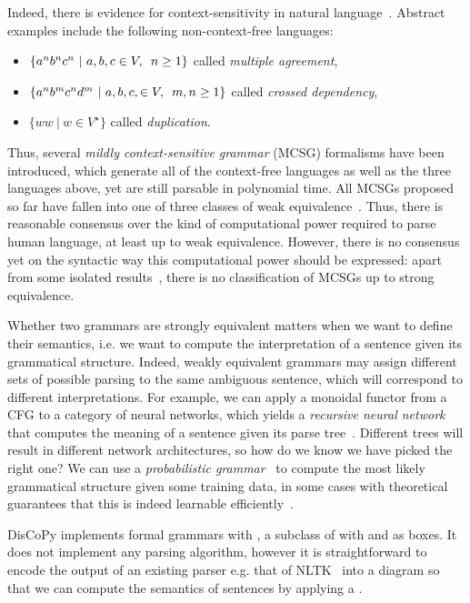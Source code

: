 Indeed, there is evidence for context-sensitivity in natural language~\cite{Shieber87}.
Abstract examples include the following non-context-free languages:
\begin{itemize}
  \item $\{ a^n b^n c^n \ \vert \ a, b, c \in V, \enspace n \geq 1 \}$ called \emph{multiple agreement},
  \item $\{ a^n b^m c^n d^m \ \vert \ a, b, c, \in V, \enspace m, n \geq 1 \}$ called \emph{crossed dependency},
  \item $\{ w w \ \vert \ w \in V^\star \}$ called \emph{duplication}.
\end{itemize}
Thus, several \emph{mildly context-sensitive grammar} (MCSG) formalisms have been introduced, which generate all of the context-free languages as well as the three languages above, yet are still parsable in polynomial time.
All MCSGs proposed so far have fallen into one of three classes of weak equivalence~\cite{Weir88}.
Thus, there is reasonable consensus over the kind of computational power required to parse human language, at least up to weak equivalence.
However, there is no consensus yet on the syntactic way this computational power should be expressed: apart from some isolated results~\cite{SchifferMaletti21}, there is no classification of MCSGs up to strong equivalence.

Whether two grammars are strongly equivalent matters when we want to define their semantics, i.e. we want to compute the interpretation of a sentence given its grammatical structure.
Indeed, weakly equivalent grammars may assign different sets of possible parsing to the same ambiguous sentence, which will correspond to different interpretations.
For example, we can apply a monoidal functor from a CFG to a category of neural networks, which yields a \emph{recursive neural network} that computes the meaning of a sentence given its parse tree~\cite{SocherEtAl11,SocherEtAl13}.
Different trees will result in different network architectures, so how do we know we have picked the right one?
We can use a \emph{probabilistic grammar}~\cite{Salomaa69} to compute the most likely grammatical structure given some training data, in some cases with theoretical guarantees that this is indeed learnable efficiently~\cite{ClarkEtAl06,ShibataYoshinaka16}.

DisCoPy implements formal grammars with , a subclass of  with  and  as boxes.
It does not implement any parsing algorithm, however it is straightforward to encode the output of an existing parser e.g. that of NLTK~\cite{LoperBird02} into a  diagram so that we can compute the semantics of sentences by applying a .

